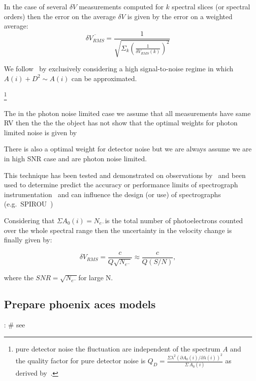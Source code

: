 In the case of several \(\delta V\) measurements computed for \(k\) spectral slices (or spectral orders) then the error on the average \(\delta V\) is given by the error on a weighted average:
\begin{equation}
\overline{\delta {V}_{RMS}} = \frac{1}{\sqrt{\Sigma_k{(\frac{1}{\delta V_{RMS}(k)})^2}}}
\end{equation}


We follow~\cite{figueira_radial_2016} by exclusively considering a high signal-to-noise regime in which \(A(i) + D^2 \sim A(i)\) can be approximated.


\footnote{pure detector noise the fluctuation are independent of the spectrum \(A\) and the quality factor for pure detector noise is \(Q_D = \frac{\Sigma{\lambda^2 {(\partial A_0(i)/\partial \lambda(i))}^{2}}}{\Sigma{\, A_0(i)}}\) as derived by~\cite{Connes1985}. }

The in the photon noise limited case we assume that all measurements have same RV then the the the object has not
\citet{Connes1985} show that the optimal weights for photon limited noise is given by 

There is also a optimal weight for detector noise but we are always assume we are in high SNR case and are photon noise limited.


This technique has been tested and demonstrated on observations by~\citet{connes_demonstration_1996} and been used to determine predict the accuracy or performance limits of spectrograph instrumentation~\citet{Connes1985,bouchy_fundamental_2001} and can influence the design (or use) of spectrographs
 (e.g.\ SPIROU~\citep{artigau_spirou_2014,figueira_radial_2016})


Considering that \(\Sigma{A_0(i)} = N_{e^-}\)is the total number of photoelectrons counted over the whole spectral range then the uncertainty in the velocity change is finally given by:

\begin{equation}
\delta V_{RMS} = \frac{c}{Q \sqrt{N_{e^-}}} \approx \frac{c}{Q (S/N)}, \label{eq:rv_SNR}
\end{equation}

where the \(SNR=\sqrt{N_{e^-}}\)for large N. 




\subsection{Prepare phoenix aces models}:
\# see~\citet{figueira_radial_2016}

